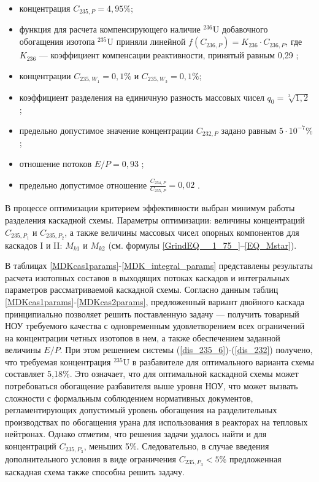 \begin{itemize}
    \item концентрация $C_{235,{P}} = {4,95\%}$; 
    \item функция для расчета компенсирующего наличие $^{236}$U добавочного обогащения изотопа $^{235}$U приняли линейной $f(C_{236,P}) = {K_{236}\cdot{C_{236,{P}}}}$, где $K_{236}$ --- коэффициент компенсации реактивности, принятый равным 0,29 \cite{smirnovEvolutionIsotopicComposition2012};
    \item концентрации $C_{235,{W_1}} = 0,1\%$ и $C_{235,{W_3}} = 0,1\%$;
    \item коэффициент разделения на единичную разность массовых чисел $q_{0} = \sqrt[3]{1,2}$ \cite{smirnovEvolutionIsotopicComposition2012};
    \item предельно допустимое значение концентрации $C_{232,{P}}$ задано равным $5\cdot10^{-7} \%$;
    \item отношение потоков $E/P = 0,93$ \cite{2024smirnovObogashchenieRegenerirovannogoUrana2018};
    \item предельно допустимое отношение $\frac{C_{234,{P}}}{C_{235,{P}}} = 0,02$ \cite{2024smirnovObogashchenieRegenerirovannogoUrana2018}. 
\end{itemize}

В процессе оптимизации критерием эффективности выбран минимум работы разделения каскадной схемы. Параметры оптимизации: величины концентраций $C_{235,{P_1}}$ и $C_{235,{P_2}}$, а также величины массовых чисел опорных компонентов для каскадов I и II: $M_{k1}$ и $M_{k2}$ (см. формулы \ref{GrindEQ__1_75_}--\ref{EQ_Mstar}). 

В таблицах \ref{MDKcas1params}-\ref{MDK_integral_params} представлены результаты расчета изотопных составов в выходящих потоках каскадов и интегральных параметров рассматриваемой каскадной схемы. Согласно данным таблиц \ref{MDKcas1params}-\ref{MDKcas2params}, предложенный вариант двойного каскада принципиально позволяет решить поставленную задачу --- получить товарный НОУ требуемого качества с одновременным удовлетворением всех ограничений на концентрации четных изотопов в нем, а также обеспечением заданной величины $E/P$. При этом решением системы (\ref{dis_235_6})-(\ref{dis_232}) получено, что требуемая концентрация $^{235}$U в разбавителе для оптимального варианта схемы составляет 5,18\%. Это означает, что для оптимальной каскадной схемы может потребоваться обогащение разбавителя выше уровня НОУ, что может вызвать сложности с формальным соблюдением нормативных документов, регламентирующих допустимый уровень обогащения на разделительных производствах по обогащения урана для использования в реакторах на тепловых нейтронах. Однако отметим, что решения задачи удалось найти и для концентраций $C_{235,{P_3}}$, меньших 5\%. Следовательно, в случае введения дополнительного условия в виде ограничения $C_{235,{P_3}} < 5\%$ предложенная каскадная схема также способна решить задачу. 

